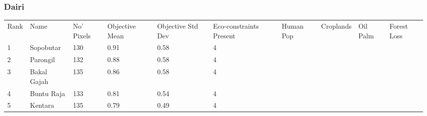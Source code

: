 \subsubsection{Dairi}
\begin{table}[ht]
\centering
\begingroup\fontsize{9pt}{10pt}\selectfont
\begin{tabular}{C{0.05\textwidth}C{0.15\textwidth}C{0.08\textwidth}C{0.08\textwidth}C{0.08\textwidth}C{0.08\textwidth}C{0.08\textwidth}C{0.08\textwidth}C{0.08\textwidth}C{0.08\textwidth}}
 Rank & Name & No' Pixels & Objective Mean & Objective Std Dev & Eco-constraints  Present & Human Pop & Croplands & Oil Palm & Forest Loss \\ 
 {1} & Sopobutar & 130 & \textcolor[HTML]{FFFFFF}{0.91} & \textcolor[HTML]{FFFFFF}{0.58} & \textcolor[HTML]{000000}{4} &  &  &  &  \\ 
  {2} & Parongil & 132 & \textcolor[HTML]{FFFFFF}{0.88} & \textcolor[HTML]{FFFFFF}{0.58} & \textcolor[HTML]{000000}{4} &  &  &  &  \\ 
  {3} & Bakal Gajah & 135 & \textcolor[HTML]{FFFFFF}{0.86} & \textcolor[HTML]{FFFFFF}{0.58} & \textcolor[HTML]{000000}{4} &  &  &  &  \\ 
  {4} & Buntu Raja & 133 & \textcolor[HTML]{FFFFFF}{0.81} & \textcolor[HTML]{FFFFFF}{0.54} & \textcolor[HTML]{000000}{4} &  &  &  &  \\ 
  {5} & Kentara & 135 & \textcolor[HTML]{FFFFFF}{0.79} & \textcolor[HTML]{000000}{0.49} & \textcolor[HTML]{000000}{4} &  &  &  &  \\ 

\end{tabular}
\end{table}
